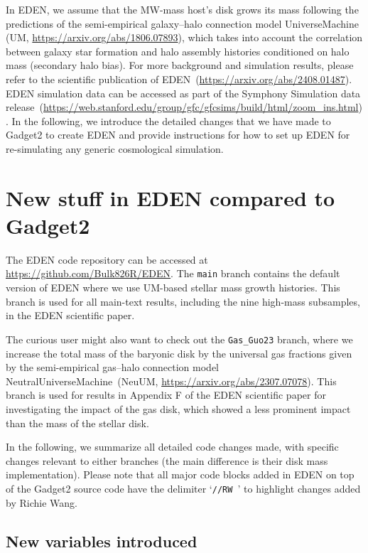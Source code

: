 \documentclass[12pt]{article}
\begin{document}
    In EDEN, we assume that the MW-mass host's disk grows its mass following the predictions of the semi-empirical galaxy--halo connection model UniverseMachine (UM, \url{https://arxiv.org/abs/1806.07893}), which takes into account the correlation between galaxy star formation and halo assembly histories conditioned on halo mass (secondary halo bias). For more background and simulation results, please refer to the scientific publication of EDEN~(\url{https://arxiv.org/abs/2408.01487}). EDEN simulation data can be accessed as part of the Symphony Simulation data release~(\url{https://web.stanford.edu/group/gfc/gfcsims/build/html/zoom_ins.html}). In the following, we introduce the detailed changes that we have made to Gadget2 to create EDEN and provide instructions for how to set up EDEN for re-simulating any generic cosmological simulation.
		
	\section{New stuff in EDEN compared to Gadget2}
    
    The EDEN code repository can be accessed at \url{https://github.com/Bulk826R/EDEN}. The \texttt{main} branch contains the default version of EDEN where we use UM-based stellar mass growth histories. This branch is used for all main-text results, including the nine high-mass subsamples, in the EDEN scientific paper. 
    
    The curious user might also want to check out the \texttt{Gas\_Guo23} branch, where we increase the total mass of the baryonic disk by the universal gas fractions given by the semi-empirical gas--halo connection model NeutralUniverseMachine~(NeuUM, \url{https://arxiv.org/abs/2307.07078}). This branch is used for results in Appendix F of the EDEN scientific paper for investigating the impact of the gas disk, which showed a less prominent impact than the mass of the stellar disk.

    In the following, we summarize all detailed code changes made, with specific changes relevant to either branches (the main difference is their disk mass implementation). Please note that all major code blocks added in EDEN on top of the Gadget2 source code have the delimiter `\texttt{//RW }' to highlight changes added by Richie Wang.
    
    \subsection{New variables introduced}
\end{document}
